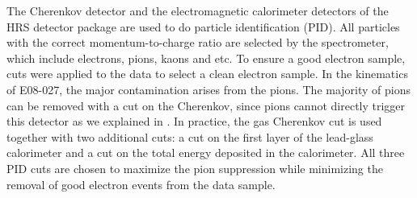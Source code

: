 The Cherenkov detector and the electromagnetic calorimeter detectors of the HRS detector package are used to do particle identification (PID). All particles with the correct momentum-to-charge ratio are selected by the spectrometer, which include electrons, pions, kaons and etc. To ensure a good electron sample, cuts were applied to the data to select a clean electron sample. In the kinematics of E08-027, the major contamination arises from the pions. The majority of pions can be removed with a cut on the Cherenkov, since pions cannot directly trigger this detector as we explained in . In practice, the gas Cherenkov cut is used together with two additional cuts: a cut on the first layer of the lead-glass calorimeter and a cut on the total energy deposited in the calorimeter. All three PID cuts are chosen to maximize the pion suppression while minimizing the removal of good electron events from the data sample.

